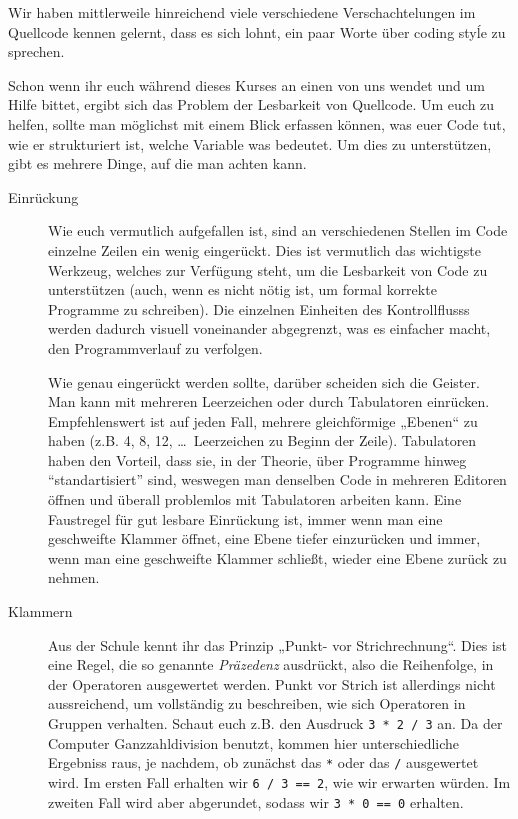 \label{sec:codingstyle}
Wir haben mittlerweile hinreichend viele verschiedene Verschachtelungen im
Quellcode kennen gelernt, dass es sich lohnt, ein paar Worte über coding styĺe
zu sprechen.

Schon wenn ihr euch während dieses Kurses an einen von uns wendet und um Hilfe
bittet, ergibt sich das Problem der Lesbarkeit von Quellcode. Um euch zu
helfen, sollte man möglichst mit einem Blick erfassen können, was euer Code
tut, wie er strukturiert ist, welche Variable was bedeutet. Um dies zu
unterstützen, gibt es mehrere Dinge, auf die man achten kann.

\begin{description}
	\item[Einrückung]
	      Wie euch vermutlich aufgefallen ist, sind an verschiedenen Stellen im
	      Code einzelne Zeilen ein wenig eingerückt. Dies ist vermutlich das
	      wichtigste Werkzeug, welches zur Verfügung steht, um die Lesbarkeit von
	      Code zu unterstützen (auch, wenn es nicht nötig ist, um formal korrekte
	      Programme zu schreiben). Die einzelnen Einheiten des Kontrollflusss
	      werden dadurch visuell voneinander abgegrenzt, was es einfacher macht,
	      den Programmverlauf zu verfolgen.

	      Wie genau eingerückt werden sollte, darüber scheiden sich die Geister.
	      Man kann mit mehreren Leerzeichen oder durch Tabulatoren einrücken.
	      Empfehlenswert ist auf jeden Fall, mehrere gleichförmige „Ebenen“ zu
	      haben (z.B. 4, 8, 12, \dots\ Leerzeichen zu Beginn der Zeile). Tabulatoren
	      haben den Vorteil, dass sie, in der Theorie, über Programme hinweg “standartisiert” sind,
	      weswegen man denselben Code in mehreren Editoren öffnen und
	      überall problemlos mit Tabulatoren arbeiten kann. Eine
	      Faustregel für gut lesbare Einrückung ist, immer wenn man eine
	      geschweifte Klammer öffnet, eine Ebene tiefer einzurücken und immer,
	      wenn man eine geschweifte Klammer schließt, wieder eine Ebene zurück zu
	      nehmen.
	\item[Klammern]
	      Aus der Schule kennt ihr das Prinzip „Punkt- vor Strichrechnung“. Dies
	      ist eine Regel, die so genannte \emph{Präzedenz} ausdrückt, also die
	      Reihenfolge, in der Operatoren ausgewertet werden. Punkt vor Strich ist
	      allerdings nicht aussreichend, um vollständig zu beschreiben, wie sich
	      Operatoren in Gruppen verhalten. Schaut euch z.B. den Ausdruck
	      \texttt{3 * 2 / 3} an. Da der Computer Ganzzahldivision benutzt, kommen
	      hier unterschiedliche Ergebniss raus, je nachdem, ob zunächst das
	      \texttt{*} oder das \texttt{/} ausgewertet wird. Im ersten Fall
	      erhalten wir \texttt{6 / 3 == 2}, wie wir erwarten würden. Im zweiten
	      Fall wird aber abgerundet, sodass wir \texttt{3 * 0 == 0} erhalten.


\end{description}
